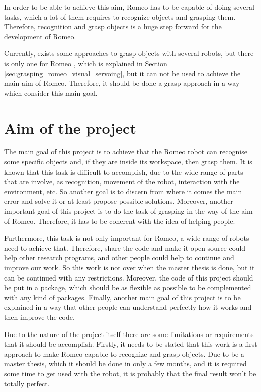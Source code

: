 \documentclass[12pt,a4paper,final,twoside,openright]{report}
\begin{document}
In order to be able to achieve this aim, Romeo has to be capable of doing several tasks, which a lot of them requires to recognize objects and grasping them. Therefore, recognition and grasp objects is a huge step forward for the development of Romeo. 

Currently, exists some approaches to grasp objects with several robots, but there is only one for Romeo  \cite{claudio:hal-01159882}, which is explained in Section \ref{sec:grasping_romeo_visual_servoing}, but it can not be used to achieve the main aim of Romeo. Therefore, it should be done a grasp approach in a way which consider this main goal.  

\section{Aim of the project}

The main goal of this project is to achieve that the Romeo robot can recognise some specific objects and, if they are inside its workspace, then grasp them. It is known that this task is difficult to accomplish, due to the wide range of parts that are involve, as recognition, movement of the robot, interaction with the environment, etc. So another goal is to discern from where it comes the main error and solve it or at least propose possible solutions. Moreover, another important goal of this project is to do the task of grasping in the way of the aim of Romeo. Therefore, it has to be coherent with the idea of helping people.

Furthermore, this task is not only important for Romeo, a wide range of robots need to achieve that. Therefore, share the code and make it open source could help other research programs, and other people could help to continue and improve our work. So this work is not over when the master thesis is done, but it can be continued with any restrictions. Moreover, the code of this project should be put in a package, which should be as flexible as possible to be complemented with any kind of packages. Finally, another main goal of this project is to be explained in a way that other people can understand perfectly how it works and then improve the code.

Due to the nature of the project itself there are some limitations or requirements that it should be accomplish. Firstly, it needs to be stated that this work is a first approach to make Romeo capable to recognize and grasp objects. Due to be a master thesis, which it should be done in only a few months, and it is required some time to get used with the robot, it is probably that the final result won't be totally perfect.
\end{document}
